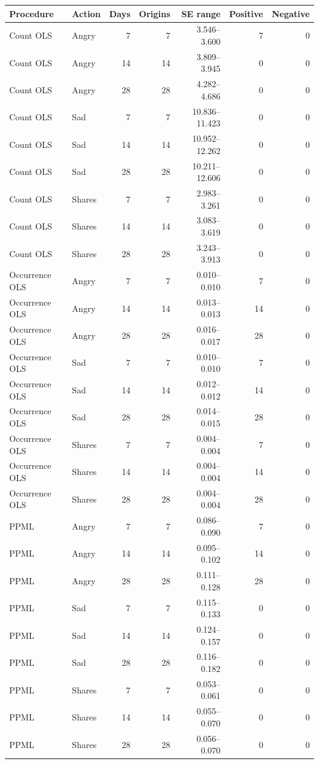 \begin{tabular}{llrrrrr}
\toprule
Procedure & Action & Days & Origins & SE range & Positive & Negative \\
\midrule
Count OLS & Angry & 7 & 7 & 3.546--3.600 & 7 & 0 \\
Count OLS & Angry & 14 & 14 & 3.809--3.945 & 0 & 0 \\
Count OLS & Angry & 28 & 28 & 4.282--4.686 & 0 & 0 \\
Count OLS & Sad & 7 & 7 & 10.836--11.423 & 0 & 0 \\
Count OLS & Sad & 14 & 14 & 10.952--12.262 & 0 & 0 \\
Count OLS & Sad & 28 & 28 & 10.211--12.606 & 0 & 0 \\
Count OLS & Shares & 7 & 7 & 2.983--3.261 & 0 & 0 \\
Count OLS & Shares & 14 & 14 & 3.083--3.619 & 0 & 0 \\
Count OLS & Shares & 28 & 28 & 3.243--3.913 & 0 & 0 \\
Occurrence OLS & Angry & 7 & 7 & 0.010--0.010 & 7 & 0 \\
Occurrence OLS & Angry & 14 & 14 & 0.013--0.013 & 14 & 0 \\
Occurrence OLS & Angry & 28 & 28 & 0.016--0.017 & 28 & 0 \\
Occurrence OLS & Sad & 7 & 7 & 0.010--0.010 & 7 & 0 \\
Occurrence OLS & Sad & 14 & 14 & 0.012--0.012 & 14 & 0 \\
Occurrence OLS & Sad & 28 & 28 & 0.014--0.015 & 28 & 0 \\
Occurrence OLS & Shares & 7 & 7 & 0.004--0.004 & 7 & 0 \\
Occurrence OLS & Shares & 14 & 14 & 0.004--0.004 & 14 & 0 \\
Occurrence OLS & Shares & 28 & 28 & 0.004--0.004 & 28 & 0 \\
PPML & Angry & 7 & 7 & 0.086--0.090 & 7 & 0 \\
PPML & Angry & 14 & 14 & 0.095--0.102 & 14 & 0 \\
PPML & Angry & 28 & 28 & 0.111--0.128 & 28 & 0 \\
PPML & Sad & 7 & 7 & 0.115--0.133 & 0 & 0 \\
PPML & Sad & 14 & 14 & 0.124--0.157 & 0 & 0 \\
PPML & Sad & 28 & 28 & 0.116--0.182 & 0 & 0 \\
PPML & Shares & 7 & 7 & 0.053--0.061 & 0 & 0 \\
PPML & Shares & 14 & 14 & 0.055--0.070 & 0 & 0 \\
PPML & Shares & 28 & 28 & 0.056--0.070 & 0 & 0 \\
\bottomrule
\end{tabular}
